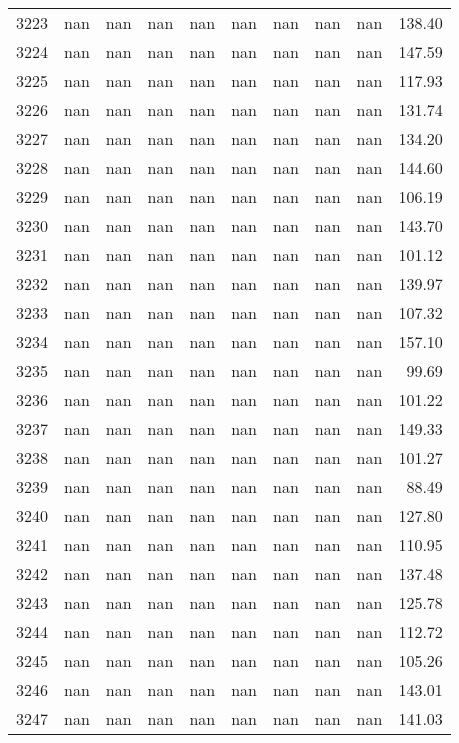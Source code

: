 \begin{tabular}{lrrrrrrrrr}
3223 & nan & nan & nan & nan & nan & nan & nan & nan & 138.40 \\
3224 & nan & nan & nan & nan & nan & nan & nan & nan & 147.59 \\
3225 & nan & nan & nan & nan & nan & nan & nan & nan & 117.93 \\
3226 & nan & nan & nan & nan & nan & nan & nan & nan & 131.74 \\
3227 & nan & nan & nan & nan & nan & nan & nan & nan & 134.20 \\
3228 & nan & nan & nan & nan & nan & nan & nan & nan & 144.60 \\
3229 & nan & nan & nan & nan & nan & nan & nan & nan & 106.19 \\
3230 & nan & nan & nan & nan & nan & nan & nan & nan & 143.70 \\
3231 & nan & nan & nan & nan & nan & nan & nan & nan & 101.12 \\
3232 & nan & nan & nan & nan & nan & nan & nan & nan & 139.97 \\
3233 & nan & nan & nan & nan & nan & nan & nan & nan & 107.32 \\
3234 & nan & nan & nan & nan & nan & nan & nan & nan & 157.10 \\
3235 & nan & nan & nan & nan & nan & nan & nan & nan & 99.69 \\
3236 & nan & nan & nan & nan & nan & nan & nan & nan & 101.22 \\
3237 & nan & nan & nan & nan & nan & nan & nan & nan & 149.33 \\
3238 & nan & nan & nan & nan & nan & nan & nan & nan & 101.27 \\
3239 & nan & nan & nan & nan & nan & nan & nan & nan & 88.49 \\
3240 & nan & nan & nan & nan & nan & nan & nan & nan & 127.80 \\
3241 & nan & nan & nan & nan & nan & nan & nan & nan & 110.95 \\
3242 & nan & nan & nan & nan & nan & nan & nan & nan & 137.48 \\
3243 & nan & nan & nan & nan & nan & nan & nan & nan & 125.78 \\
3244 & nan & nan & nan & nan & nan & nan & nan & nan & 112.72 \\
3245 & nan & nan & nan & nan & nan & nan & nan & nan & 105.26 \\
3246 & nan & nan & nan & nan & nan & nan & nan & nan & 143.01 \\
3247 & nan & nan & nan & nan & nan & nan & nan & nan & 141.03 \\

\end{tabular}
